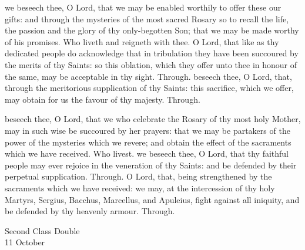 \secret
{} we beseech thee, O Lord, that we may be enabled worthily to offer these our gifts: and through the mysteries of the most sacred Rosary so to recall the life, the passion and the glory of thy only-begotten Son; that we may be made worthy of his promises. Who liveth and reigneth with thee.
 O Lord, that like as thy dedicated people do acknowledge that in tribulation they have been succoured by the merits of thy Saints: so this oblation, which they offer unto thee in honour of the same, may be acceptable in thy sight. Through.
 beseech thee, O Lord, that, through the meritorious supplication of thy Saints: this sacrifice, which we offer, may obtain for us the favour of thy majesty. Through.


\postcommunion
{} beseech thee, O Lord, that we who celebrate the Rosary of thy most holy Mother, may in such wise be succoured by her prayers: that we may be partakers of the power of the mysteries which we revere; and obtain the effect of the sacraments which we have received. Who livest.
 we beseech thee, O Lord, that thy faithful people may ever rejoice in the veneration of thy Saints: and be defended by their perpetual supplication. Through.
 O Lord, that, being strengthened by the sacraments which we have received: we may, at the intercession of thy holy Martyrs, Sergius, Bacchus, Marcellus, and Apuleius, fight against all iniquity, and be defended by thy heavenly armour. Through.


\begin{inhead}
    {Second Class Double\\
11 October}
\end{inhead}

